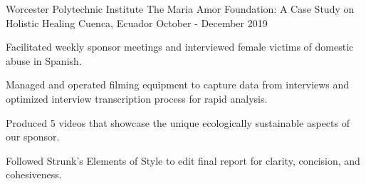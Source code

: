\begin{cventries}
  \cventry
    {Worcester Polytechnic Institute} %
    {The Maria Amor Foundation: A Case Study on Holistic Healing} %
    {Cuenca, Ecuador} %
    {October - December 2019} %
    {
      \begin{cvitems} %
        \item {Facilitated weekly sponsor meetings and interviewed female victims of domestic abuse in Spanish.}
        \item {Managed and operated filming equipment to capture data from
        interviews and optimized interview transcription process for rapid analysis.}
        \item {Produced 5 videos that showcase the unique ecologically sustainable aspects of our sponsor.}
        \item {Followed
        Strunk's Elements of Style to edit final report for clarity, concision, and cohesiveness.}
      \end{cvitems}
    }

\end{cventries}

